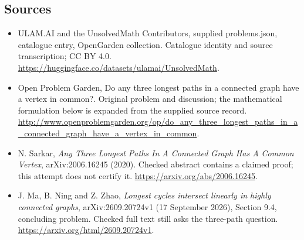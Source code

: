 \documentclass[11pt,a4paper]{article}
\begin{document}
\subsection{Sources}
\begin{itemize}
\item[S1] ULAM.AI and the UnsolvedMath Contributors, supplied problems.json, catalogue entry, OpenGarden collection. Catalogue identity and source transcription; CC BY 4.0.
\url{https://huggingface.co/datasets/ulamai/UnsolvedMath}.
\item[S2] Open Problem Garden, Do any three longest paths in a connected graph have a vertex in common?. Original problem and discussion; the mathematical formulation below is expanded from the supplied source record.
\url{http://www.openproblemgarden.org/op/do_any_three_longest_paths_in_a_connected_graph_have_a_vertex_in_common}.
\item[R1] N. Sarkar, \emph{Any Three Longest Paths In A Connected Graph Has A Common Vertex}, arXiv:2006.16245 (2020). Checked abstract contains a claimed proof; this attempt does not certify it.
\url{https://arxiv.org/abs/2006.16245}.
\item[R2] J. Ma, B. Ning and Z. Zhao, \emph{Longest cycles intersect linearly in highly connected graphs}, arXiv:2609.20724v1 (17 September 2026), Section 9.4, concluding problem. Checked full text still asks the three-path question.
\url{https://arxiv.org/html/2609.20724v1}.
\end{itemize}
\end{document}
